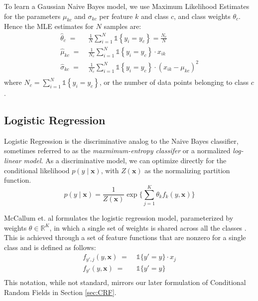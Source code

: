 \documentclass{article}
\begin{document}
To learn a Gaussian Naive Bayes model, we use Maximum Likelihood Estimates for
the parameters $\mu_{kc}$ and $\sigma_{kc}$ per feature $k$ and class $c$, and class weights
$\theta_c$. Hence the MLE estimates for $N$ samples are:
\begin{equation}
  \begin{aligned}
    \hat{\theta}_c \; = \; & \frac{1}{N} \sum_{i=1}^N \mathds{1} \left \{ y_i = y_c \right \} = \frac{N_c}{N} \\
    \hat{\mu}_{kc} \; = \; & \frac{1}{N_c} \sum_{i=1}^N \mathds{1} \left \{ y_i = y_c \right \} \cdot x_{ik} \\
    \hat{\sigma}_{kc} \; = \; & \frac{1}{N_c} \sum_{i=1}^N \mathds{1} \left \{ y_i = y_c \right \} \cdot \left( x_{ik} - \mu_{kc} \right)^2 \\
  \end{aligned}
\end{equation}
where $N_c = \sum_{i=1}^N \mathds{1} \left \{ y_i = y_c \right \} $, or the number
of data points belonging to class $c$ \cite{murphy}.
\subsection{Logistic Regression}
\label{sec:LR}
Logistic Regression is the discriminative analog to the Naive Bayes
classifier, sometimes referred to as the \textit{maxmimum-entropy classifer}
or a normalized \textit{log-linear model}. As a discriminative model,
we can optimize directly for the conditional likelihood $p(y \mid \mathbf{x})$,
with $Z(\mathbf{x})$ as the normalizing partition function.
\begin{equation}
  p(y \mid \mathbf{x}) = \frac{1}{Z(\mathbf{x})} \exp \Bigg\{ \sum_{j=1}^K \theta_k f_k\left( y, \mathbf{x} \right) \Bigg\}
\end{equation}

McCallum et. al formulates the logistic regression model, parameterized by
weights $\theta \in \mathbb{R}^K$, in which a single set of weights is shared
across all the classes \cite{McCallumCRF}. This is achieved through a set of
feature functions that are nonzero for a single class and is defined as follows:
\begin{equation}
  \begin{aligned}
    f_{y', j} \left( y, \mathbf{x} \right) \; = \; & \mathds{1} \{ y' = y \} \cdot x_j \\
    f_{y'} \left(y, \mathbf{x}\right) \; = \; & \mathds{1} \{ y' = y \} \\
  \end{aligned}
\end{equation}
This notation, while not standard, mirrors our later formulation of Conditional
Random Fields in Section \ref{sec:CRF}.
\end{document}

